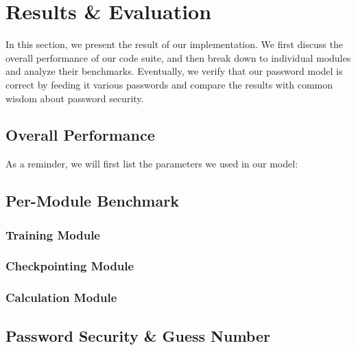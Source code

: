 \documentclass{article} %
\theoremstyle{definition}
\theoremstyle{theorem}
\theoremstyle{remark}
\theoremstyle{remark}
\begin{document}
\section{Results \& Evaluation} \label{sect:results}
\par\quad In this section, we present the result of our implementation. We first discuss the overall performance of our code suite, and then break down to individual modules and analyze their benchmarks. Eventually, we verify that our password model is correct by feeding it various passwords and compare the results with common wisdom about password security.

\subsection{Overall Performance}
\par\quad As a reminder, we will first list the parameters we used in our model: 

\subsection{Per-Module Benchmark}
\par\quad 

\subsubsection{Training Module}
\par\quad 

\subsubsection{Checkpointing Module}
\par\quad 

\subsubsection{Calculation Module}
\par\quad 

\subsection{Password Security \& Guess Number}
\par\quad 
\end{document}
